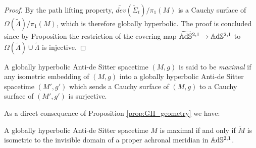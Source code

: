 \begin{proof}
    By the path lifting property, $\widetilde{dev}(\widetilde{\Sigma}_t) / \pi_1(M)$ is a Cauchy surface of $\Omega(\widetilde{\Lambda}) / \pi_1(M)$, which is therefore globally hyperbolic. The proof is concluded since by Proposition  the restriction of the covering map $\widetilde{\mathbb{A}\mathrm{d}\mathbb{S}}{}^{2,1} \to \mathbb{A}\mathrm{d}\mathbb{S}^{2,1}$ to $\Omega(\widetilde{\Lambda}) \cup \widetilde{\Lambda}$ is injective.
\end{proof}
\begin{definition}
    A globally hyperbolic Anti-de Sitter spacetime $(M,g)$ is said to be \textit{maximal} if any isometric embedding of $(M,g)$ into a globally hyperbolic Anti-de Sitter spacetime $(M',g')$ which sends a Cauchy surface of $(M,g)$ to a Cauchy surface of $(M',g')$ is surjective.
\end{definition}
As a direct consequence of Proposition \ref{prop:GH_geometry} we have:
\begin{corollary} \label{cor:MGH}
    A globally hyperbolic Anti-de Sitter spacetime $M$ is maximal if and only if $\widetilde{M}$ is isometric to the invisible domain of a proper achronal meridian in $\mathbb{A}\mathrm{d}\mathbb{S}^{2,1}$.
\end{corollary}

